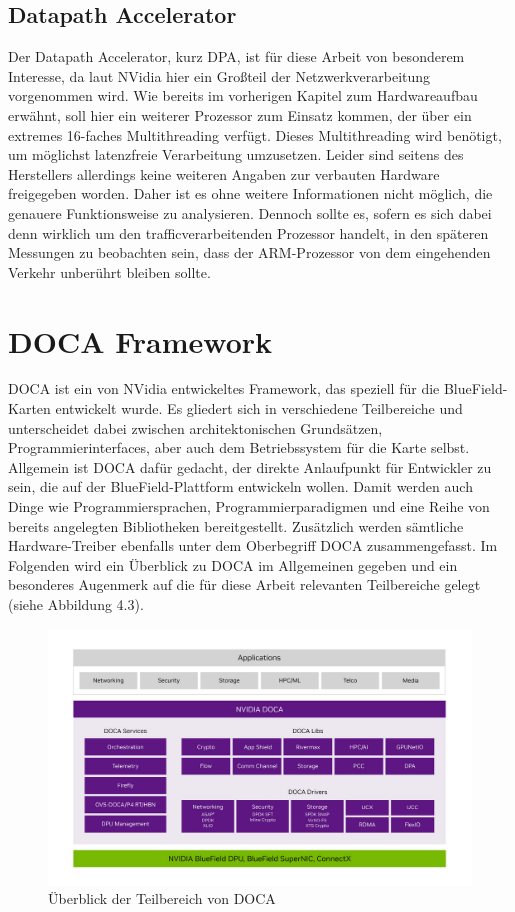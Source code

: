 \subsection{Datapath Accelerator}
Der Datapath Accelerator, kurz DPA, ist für diese Arbeit von besonderem Interesse, da laut NVidia hier ein Großteil der Netzwerkverarbeitung vorgenommen wird. Wie bereits im vorherigen Kapitel zum Hardwareaufbau erwähnt, soll hier ein weiterer Prozessor zum Einsatz kommen, der über ein extremes 16-faches Multithreading verfügt. Dieses Multithreading wird benötigt, um möglichst latenzfreie Verarbeitung umzusetzen. \cite{nvidia_dpa_subsystem_2025} Leider sind seitens des Herstellers allerdings keine weiteren Angaben zur verbauten Hardware freigegeben worden. Daher ist es ohne weitere Informationen nicht möglich, die genauere Funktionsweise zu analysieren. Dennoch sollte es, sofern es sich dabei denn wirklich um den trafficverarbeitenden Prozessor handelt, in den späteren Messungen zu beobachten sein, dass der ARM-Prozessor von dem eingehenden Verkehr unberührt bleiben sollte.

\section{DOCA Framework}
DOCA ist ein von NVidia entwickeltes Framework, das speziell für die BlueField-Karten entwickelt wurde. Es gliedert sich in verschiedene Teilbereiche und unterscheidet dabei zwischen architektonischen Grundsätzen, Programmierinterfaces, aber auch dem Betriebssystem für die Karte selbst. Allgemein ist DOCA dafür gedacht, der direkte Anlaufpunkt für Entwickler zu sein, die auf der BlueField-Plattform entwickeln wollen. Damit werden auch Dinge wie Programmiersprachen, Programmierparadigmen und eine Reihe von bereits angelegten Bibliotheken bereitgestellt. Zusätzlich werden sämtliche Hardware-Treiber ebenfalls unter dem Oberbegriff DOCA zusammengefasst. \cite{nvidia_doca_framework} Im Folgenden wird ein Überblick zu DOCA im Allgemeinen gegeben und ein besonderes Augenmerk auf die für diese Arbeit relevanten Teilbereiche gelegt  (siehe Abbildung 4.3).
\begin{figure}
    \centering
    \includegraphics[width=1\linewidth]{images/Screenshot 2025-04-26 at 08-31-41 DOCA Overview - NVIDIA Docs.png}
    \caption{Überblick der Teilbereich von DOCA \cite{nvidia_doca_framework}}
    \label{fig:enter-label}
\end{figure}
